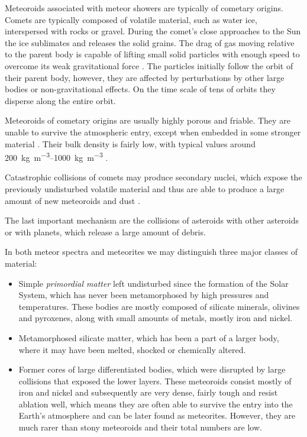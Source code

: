             Meteoroids associated with meteor showers are typically of cometary origins.
            Comets are typically composed of volatile material, such as water ice, interspersed
            with rocks or gravel. During the comet's close approaches to the Sun the ice sublimates
            and releases the solid grains. The drag of gas moving relative to the parent body
            is capable of lifting small solid particles with enough speed to overcome
            its weak gravitational force \citep{whipple1951}.
            The particles initially follow the orbit of their parent body,
            however, they are affected by perturbations by other large bodies or non-gravitational effects.
            On the time scale of tens of orbits they disperse along the entire orbit.

            Meteoroids of cometary origins are usually highly porous and friable.
            They are unable to survive the atmospheric entry, except when embedded in some stronger material \citep{nittler+2019}.
            Their bulk density is fairly low, with typical values around
            \SIrange{200}{1000}{\kilo\gram\per\cubic\metre} \citep{???} .

            Catastrophic collisions of comets may produce secondary nuclei, which expose
            the previously undisturbed volatile material and thus are able to produce
            a large amount of new meteoroids and dust \citep{jenniskens2006}.

            The last important mechanism are the collisions of asteroids with other asteroids
            or with planets, which release a large amount of debris.

            In both meteor spectra and meteorites we may distinguish three major classes of material:
            \begin{itemize}
                \item Simple \emph{primordial matter} left undisturbed since the formation of the Solar System,
                    which has never been metamorphosed by high pressures and temperatures.
                    These bodies are mostly composed of silicate minerals, olivines and pyroxenes,
                    along with small amounts of metals, mostly iron and nickel.
                \item Metamorphosed silicate matter, which has been a part of a larger body,
                    where it may have been melted, shocked or chemically altered.
                \item Former cores of large differentiated bodies, which were disrupted by large collisions
                    that exposed the lower layers.
                    These meteoroids consist mostly of iron and nickel and subsequently are very dense,
                    fairly tough and resist ablation well, which means they are often able to
                    survive the entry into the Earth's atmosphere and can be later found as meteorites.
                    However, they are much rarer than stony meteoroids and their total numbers are low.
            \end{itemize}


